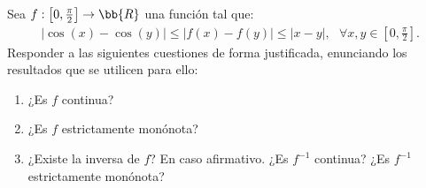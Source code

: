 \documentclass[12pt]{article}
\begin{document}
    \begin{ejercicio}[1,5 puntos]
        Sea $f : \left[ 0, \frac{\pi}{2}\right] \rightarrow \bb{R}$ una función tal que:
        \begin{gather*}
            |\cos(x) - \cos(y)| \leq |f(x)-f(y)|\leq |x-y|, \ \ \ \forall x,y \in \left[ 0, \frac{\pi}{2}\right].
        \end{gather*}
        Responder a las siguientes cuestiones de forma justificada, enunciando los resultados que se utilicen para ello:
        \begin{enumerate}
            \item ¿Es $f$ continua?
            \item ¿Es $f$ estrictamente monónota?
            \item ¿Existe la inversa de $f$? En caso afirmativo. ¿Es $f^{-1}$ continua? ¿Es $f^{-1}$ estrictamente monónota?
        \end{enumerate}
    \end{ejercicio}
   
\end{document}

